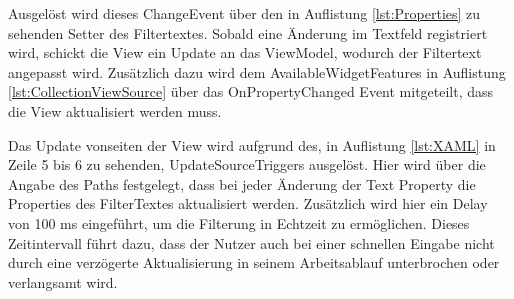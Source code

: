 Ausgelöst wird dieses ChangeEvent über den in Auflistung \ref{lst:Properties} zu sehenden Setter des Filtertextes.
Sobald eine Änderung im Textfeld registriert wird, schickt die View ein Update an das ViewModel, wodurch der Filtertext angepasst wird.
Zusätzlich dazu wird dem AvailableWidgetFeatures in Auflistung \ref{lst:CollectionViewSource} über das OnPropertyChanged Event mitgeteilt, dass die View aktualisiert werden muss.




Das Update vonseiten der View wird aufgrund des, in Auflistung \ref{lst:XAML} in Zeile 5 bis 6 zu sehenden, UpdateSourceTriggers ausgelöst. 
Hier wird über die Angabe des Paths festgelegt, dass bei jeder Änderung der Text Property die Properties des FilterTextes aktualisiert werden.
Zusätzlich wird hier ein Delay von 100 ms eingeführt, um die Filterung in Echtzeit zu ermöglichen.
Dieses Zeitintervall führt dazu, dass der Nutzer auch bei einer schnellen Eingabe nicht durch eine verzögerte Aktualisierung in seinem Arbeitsablauf unterbrochen  oder verlangsamt wird.




